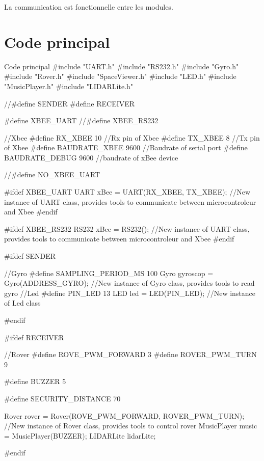 {\begin{enumerate}

La communication est fonctionnelle entre les modules.
\end{enumerate}


\label{code}
\section{Code principal}

\begin{Cpp}{Code principal}
#include "UART.h"
#include "RS232.h"
#include "Gyro.h"
#include "Rover.h"
#include "SpaceViewer.h"
#include "LED.h"
#include "MusicPlayer.h"
#include "LIDARLite.h"
 
//#define SENDER  
#define RECEIVER

#define XBEE_UART
//#define XBEE_RS232 

//Xbee
#define RX_XBEE 10   //Rx pin of Xbee
#define TX_XBEE 8  //Tx pin of Xbee
#define BAUDRATE_XBEE 9600    //Baudrate of serial port
#define BAUDRATE_DEBUG 9600   //baudrate of xBee device


//#define NO_XBEE_UART 

#ifdef XBEE_UART
UART xBee = UART(RX_XBEE, TX_XBEE);                     //New instance of UART class, provides tools to communicate between microcontroleur and Xbee
#endif


#ifdef XBEE_RS232
RS232 xBee = RS232();                     //New instance of UART class, provides tools to communicate between microcontroleur and Xbee
#endif

#ifdef SENDER

  //Gyro
  #define SAMPLING_PERIOD_MS 100
  Gyro gyroscop = Gyro(ADDRESS_GYRO);                         //New instance of Gyro class, provides tools to read gyro
  //Led
  #define PIN_LED 13
  LED led = LED(PIN_LED);                                 //New instance of Led class

#endif


#ifdef RECEIVER

  //Rover
  #define ROVE_PWM_FORWARD 3
  #define ROVER_PWM_TURN 9

  #define BUZZER 5

  #define SECURITY_DISTANCE 70
  
  Rover rover = Rover(ROVE_PWM_FORWARD, ROVER_PWM_TURN);  //New instance of Rover class, provides tools to control rover
  MusicPlayer music = MusicPlayer(BUZZER);
  LIDARLite lidarLite;
 

#endif



\end{Cpp}}
